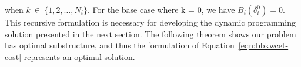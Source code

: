 \newline
\noindent
when $k\ \in\ \{1, 2, \ldots, N_i\}$.  For the base case where $\textrm{k = 0}$, we have $B_{i}(\delta_{i}^{0}) = 0$.  This recursive formulation is necessary for developing the dynamic programming solution presented in the next section.  The following theorem shows our problem has optimal substructure, and thus the formulation of Equation~\ref{eqn:bbkwcet-cost} represents an optimal solution.
%
%
